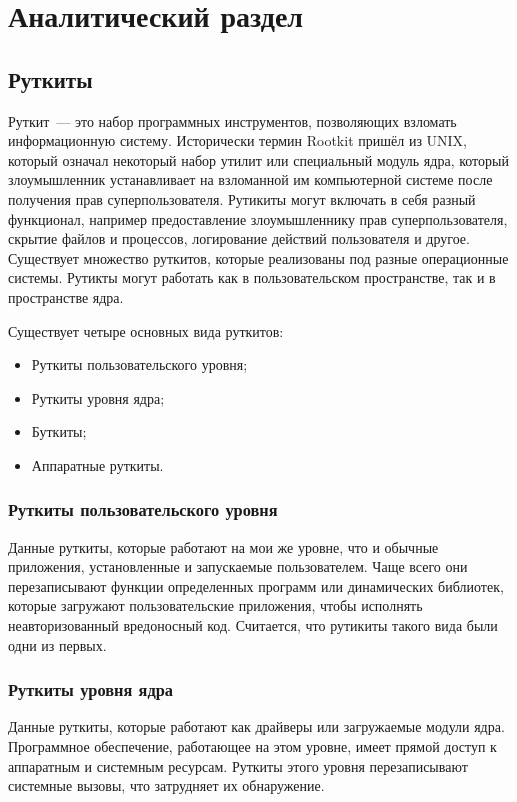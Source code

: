 \chapter{Аналитический раздел}%
\label{cha:analiticheskii_razdel}


\section{Руткиты}%
\label{sec:rutkity}

Руткит~--- это набор программных инструментов, позволяющих взломать информационную систему. Исторически термин Rootkit пришёл из UNIX, который означал некоторый набор утилит или специальный модуль ядра, который злоумышленник устанавливает на взломанной им компьютерной системе после получения прав суперпользователя. Рутикиты могут включать в себя разный функционал, например предоставление злоумышленнику прав суперпользователя, скрытие файлов и процессов, логирование действий пользователя и другое. Существует множество руткитов, которые реализованы под разные операционные системы. Рутикты могут работать как в пользовательском пространстве, так и в пространстве ядра.

Существует четыре основных вида руткитов:
\begin{itemize}
    \item Руткиты пользовательского уровня;
    \item Руткиты уровня ядра;
    \item Буткиты;
    \item Аппаратные руткиты.
\end{itemize}

\subsection{Руткиты пользовательского уровня} Данные руткиты, которые работают на мои же уровне, что и обычные приложения, установленные и запускаемые пользователем. Чаще всего они перезаписывают функции определенных программ или динамических библиотек, которые загружают пользовательские приложения, чтобы исполнять неавторизованный вредоносный код. Считается, что рутикиты такого вида были одни из первых.

\subsection{Руткиты уровня ядра} Данные руткиты, которые работают как драйверы или загружаемые модули ядра. Программное обеспечение, работающее на этом уровне, имеет прямой доступ к аппаратным и системным ресурсам. Руткиты этого уровня перезаписывают системные вызовы, что затрудняет их обнаружение.

